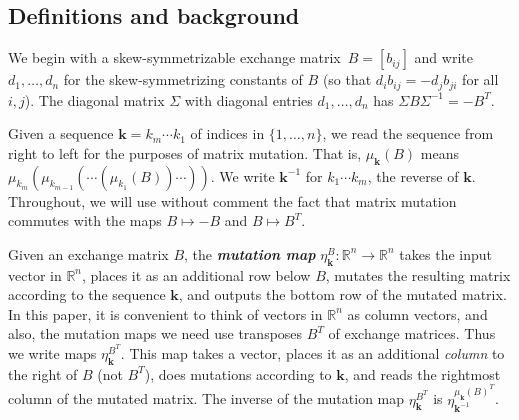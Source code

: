 \documentclass{amsart}
\theoremstyle{definition}
\theoremstyle{remark}
\numberwithin{equation}{section}
\newcommand{\newword}[1]{\textbf{\emph{#1}}}
\newcommand{\reals}{\mathbb R}
\newcommand{\set}[1]{{\lbrace #1 \rbrace}}
\newcommand{\0}{{\mathbf{0}}}
\newcommand{\kk}{{\boldsymbol{k}}}
\begin{document}
\subsection{Definitions and background}\label{def sec}
We begin with a skew-symmetrizable exchange matrix~$B=[b_{ij}]$ and write $d_1,\ldots,d_n$ for the skew-symmetrizing constants of $B$ (so that $d_i b_{ij}=-d_j b_{ji}$ for all $i,j$).
The diagonal matrix $\Sigma$ with diagonal entries $d_1,\ldots,d_n$ has $\Sigma B\Sigma^{-1}=-B^T$.

Given a sequence $\kk=k_m\cdots k_1$ of indices in $\set{1,\ldots,n}$, we read the sequence from right to left for the purposes of matrix mutation.
That is, $\mu_\kk(B)$ means $\mu_{k_m}(\mu_{k_{m-1}}(\cdots(\mu_{k_1}(B))\cdots))$.
We write $\kk^{-1}$ for $k_1\cdots k_m$, the reverse of $\kk$.
Throughout, we will use without comment the fact that matrix mutation commutes with the maps $B\mapsto-B$ and $B\mapsto B^T$.

Given an exchange matrix $B$, the \newword{mutation map} $\eta^B_\kk:\reals^n\to\reals^n$ takes the input vector in $\reals^n$, places it as an additional row below $B$, mutates the resulting matrix according to the sequence $\kk$, and outputs the bottom row of the mutated matrix.
In this paper, it is convenient to think of vectors in $\reals^n$ as column vectors, and also, the mutation maps we need use transposes $B^T$ of exchange matrices.
Thus we write maps $\eta_\kk^{B^T}$.
This map takes a vector, places it as an additional \emph{column} to the right of $B$ (not $B^T$), does mutations according to $\kk$, and reads the rightmost column of the mutated matrix.
The inverse of the mutation map $\eta^{B^T}_\kk$ is $\eta_{\kk^{-1}}^{\mu_\kk(B)^T}$.
\end{document}

